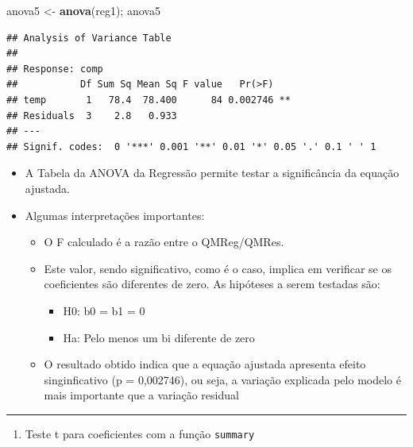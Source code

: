\documentclass[
]{book}
\newenvironment{Shaded}{\begin{snugshade}}{\end{snugshade}}
\newcommand{\FunctionTok}[1]{\textcolor[rgb]{0.13,0.29,0.53}{\textbf{#1}}}
\newcommand{\NormalTok}[1]{#1}
\newcommand{\OtherTok}[1]{\textcolor[rgb]{0.56,0.35,0.01}{#1}}
\providecommand{\tightlist}{%
  \setlength{\itemsep}{0pt}\setlength{\parskip}{0pt}}
\begin{document}
\begin{Shaded}
\begin{Highlighting}[]
\NormalTok{anova5 }\OtherTok{\textless{}{-}} \FunctionTok{anova}\NormalTok{(reg1); anova5}
\end{Highlighting}
\end{Shaded}

\begin{verbatim}
## Analysis of Variance Table
## 
## Response: comp
##           Df Sum Sq Mean Sq F value   Pr(>F)   
## temp       1   78.4  78.400      84 0.002746 **
## Residuals  3    2.8   0.933                    
## ---
## Signif. codes:  0 '***' 0.001 '**' 0.01 '*' 0.05 '.' 0.1 ' ' 1
\end{verbatim}

\begin{itemize}
\item
  A Tabela da ANOVA da Regressão permite testar a significância da equação ajustada.
\item
  Algumas interpretações importantes:

  \begin{itemize}
  \tightlist
  \item
    O F calculado é a razão entre o QMReg/QMRes.
  \item
    Este valor, sendo significativo, como é o caso, implica em verificar se os coeficientes são diferentes de zero. As hipóteses a serem testadas são:

    \begin{itemize}
    \tightlist
    \item
      H0: b0 = b1 = 0
    \item
      Ha: Pelo menos um bi diferente de zero
    \end{itemize}
  \item
    O resultado obtido indica que a equação ajustada apresenta efeito singinficativo (p = 0,002746), ou seja, a variação explicada pelo modelo é mais importante que a variação residual
  \end{itemize}
\end{itemize}

\begin{center}\rule{0.5\linewidth}{0.5pt}\end{center}

\begin{enumerate}
\def\labelenumi{\arabic{enumi}.}
\setcounter{enumi}{1}
\tightlist
\item
  Teste t para coeficientes com a função \texttt{summary}
\end{enumerate}
\end{document}
